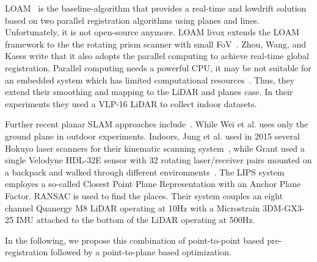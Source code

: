 LOAM~\cite{Zhang2014} is the baseline-algorithm that provides a real-time and lowdrift solution based on two parallel registration algorithms using planes and lines.
Unfortunately, it is not open-source anymore.
LOAM livox extends the LOAM framework to the the rotating prism scanner with small FoV~\cite{Lin_2020}.
Zhou, Wang, and Kaess write that it also adopts the parallel computing to achieve real-time global registration.
Parallel computing needs a powerful CPU, it may be not suitable for an embedded system which has limited computational resources~\cite{Zhou_2021}.
Thus, they extend their smoothing and mapping to the LiDAR and planes case.
In their experiments they used a VLP-16 LiDAR to collect indoor datasets.

Further recent planar SLAM approaches include~\cite{Jung_2015,Grant_2018,Geneva_2018, Zhou_2021,   wei2021groundslam}.
While Wei et al. uses only the ground plane in outdoor experiments.
Indoors, Jung et al. used in 2015 several Hokuyo laser scanners for their kinematic scanning system~\cite{Jung_2015}, while Grant used a single Velodyne HDL-32E sensor with 32 rotating laser/receiver pairs mounted on a backpack and walked through different environments~\cite{Grant_2018}.
The LIPS system~\cite{Geneva_2018} employes a so-called Closest Point Plane Representation with an Anchor Plane Factor.
RANSAC is used to find the places.
Their system couples an eight channel Quanergy M8 LiDAR operating at 10Hz with a Microstrain 3DM-GX3-25 IMU attached to the bottom of the LiDAR operating at 500Hz.

\bigskip

In the following, we propose this combination of point-to-point based pre-registration followed by a point-to-plane based optimization. 
